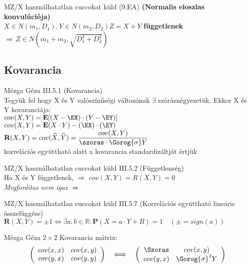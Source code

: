   \begin{tetel}{MZ/X használhatatlan cuccokat küld}
	(9.EA) \textbf{(Normalis eloszlas konvulúciója)} \\[2pt]
		$X \in N(m_1,D_1), Y \in N(m_2,D_2) Z = X+Y $ \textbf{függetlenek} $\Longrightarrow\, Z \in N(m_1+m_2 , \sqrt{D^2_1 + D^2_2} ) $
\end{tetel}

\subsection{Kovarancia}

  \begin{definicio}{Mézga Géza}
	III.5.1 (Kovarancia)\\[3pt]
		Tegyük fel hogy X és Y valószínűségi változónak $\exists $ szórásnégyezetük. Ekkor X és Y kovaranciája:\\[3pt]
		\forceindent $cov(X,Y) = \textbf{E}[(X-\EX)\cdot(Y-\EY)]$ \\[2pt]
		\forceindent $cov(X,Y) = \textbf{E}(X\cdot Y)-(\EX)\cdot (\EY)$ \\[3pt]
		\forceindent $\textbf{R}(X,Y) = cov(\widetilde{X},\widetilde{Y}) = \dfrac{cov(X,Y)}{\szoras \cdot \Gorog{\sigma}Y}$\\[2pt]
	korrelációs együttható alatt a kovarancia standardizáltját értjük\\[6pt]
\end{definicio}

  \begin{tetel}{MZ/X használhatatlan cuccokat küld}
	III.5.2 (Függetlenség)\\[3pt]
	\forceindent Ha X és Y függetlenek, $\Longrightarrow$ $cov(X,Y) = R(X,Y) = 0 $\\[2pt]
	\small \textit{Megforditas nem igaz } $\nLeftarrow$\\[6pt] \normalsize
\end{tetel}

  \begin{tetel}{MZ/X használhatatlan cuccokat küld}
	III.5.7 (Korrelációs együttható lineáris összefüggése)\\[3pt]
		\forceindent $\textbf{R}(X,Y) = \pm 1 \Longleftrightarrow \exists a,b \in \mathbb{R} : \textbf{P}(X = a \cdot Y + B ) = 1 \quad( \pm = sign(a) ) $\\[6pt]
\end{tetel}

	\begin{definicio}{Mézga Géza}
   $2 \times 2$ Kovarancia mátrix:
\[ \left( \begin{array}{cc}
cov(x,x) & cov(x,y) \\
cov(y,x) & cov(y,y) \end{array} \right) \quad  \Longleftrightarrow \quad
 \left( \begin{array}{cc}
\Szoras & cov(x,y) \\
cov(y,x) & \Gorog{\sigma}^2Y \end{array} \right)\]
\end{definicio}

